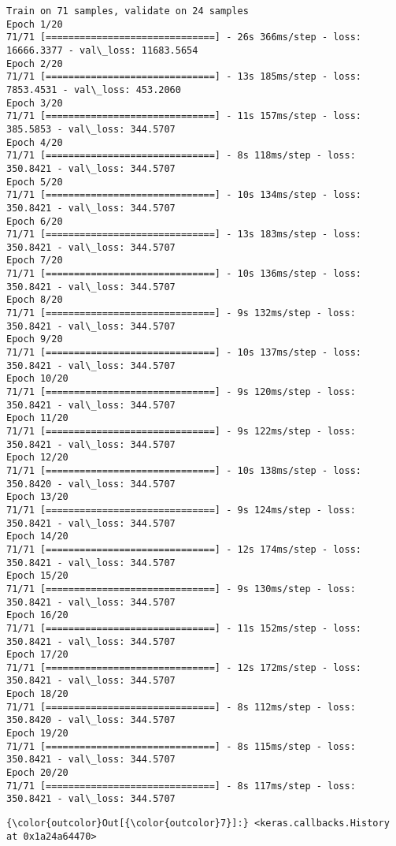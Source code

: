 \documentclass[11pt]{article}
\begin{document}
    \begin{Verbatim}[commandchars=\\\{\}]
Train on 71 samples, validate on 24 samples
Epoch 1/20
71/71 [==============================] - 26s 366ms/step - loss: 16666.3377 - val\_loss: 11683.5654
Epoch 2/20
71/71 [==============================] - 13s 185ms/step - loss: 7853.4531 - val\_loss: 453.2060
Epoch 3/20
71/71 [==============================] - 11s 157ms/step - loss: 385.5853 - val\_loss: 344.5707
Epoch 4/20
71/71 [==============================] - 8s 118ms/step - loss: 350.8421 - val\_loss: 344.5707
Epoch 5/20
71/71 [==============================] - 10s 134ms/step - loss: 350.8421 - val\_loss: 344.5707
Epoch 6/20
71/71 [==============================] - 13s 183ms/step - loss: 350.8421 - val\_loss: 344.5707
Epoch 7/20
71/71 [==============================] - 10s 136ms/step - loss: 350.8421 - val\_loss: 344.5707
Epoch 8/20
71/71 [==============================] - 9s 132ms/step - loss: 350.8421 - val\_loss: 344.5707
Epoch 9/20
71/71 [==============================] - 10s 137ms/step - loss: 350.8421 - val\_loss: 344.5707
Epoch 10/20
71/71 [==============================] - 9s 120ms/step - loss: 350.8421 - val\_loss: 344.5707
Epoch 11/20
71/71 [==============================] - 9s 122ms/step - loss: 350.8421 - val\_loss: 344.5707
Epoch 12/20
71/71 [==============================] - 10s 138ms/step - loss: 350.8420 - val\_loss: 344.5707
Epoch 13/20
71/71 [==============================] - 9s 124ms/step - loss: 350.8421 - val\_loss: 344.5707
Epoch 14/20
71/71 [==============================] - 12s 174ms/step - loss: 350.8421 - val\_loss: 344.5707
Epoch 15/20
71/71 [==============================] - 9s 130ms/step - loss: 350.8421 - val\_loss: 344.5707
Epoch 16/20
71/71 [==============================] - 11s 152ms/step - loss: 350.8421 - val\_loss: 344.5707
Epoch 17/20
71/71 [==============================] - 12s 172ms/step - loss: 350.8421 - val\_loss: 344.5707
Epoch 18/20
71/71 [==============================] - 8s 112ms/step - loss: 350.8420 - val\_loss: 344.5707
Epoch 19/20
71/71 [==============================] - 8s 115ms/step - loss: 350.8421 - val\_loss: 344.5707
Epoch 20/20
71/71 [==============================] - 8s 117ms/step - loss: 350.8421 - val\_loss: 344.5707

    \end{Verbatim}

\begin{Verbatim}[commandchars=\\\{\}]
{\color{outcolor}Out[{\color{outcolor}7}]:} <keras.callbacks.History at 0x1a24a64470>
\end{Verbatim}
            
\end{document}
